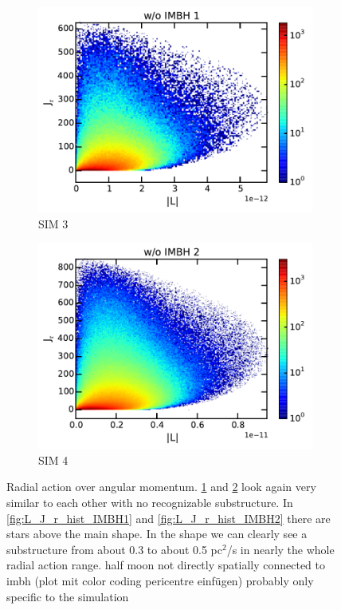 \begin{figure}[htbp]
\begin{subfigure}{0.475\textwidth}
		\includegraphics[width=\textwidth]{Plots/L_J_r_hist_noIMBH1.pdf}
		\caption{SIM 3}
		\label{fig:L_J_r_hist_noIMBH1}
	\end{subfigure}
	\hfill
	\begin{subfigure}{0.475\textwidth}
		\includegraphics[width=\textwidth]{Plots/L_J_r_hist_noIMBH2.pdf}
		\caption{SIM 4}
		\label{fig:L_J_r_hist_noIMBH2}
	\end{subfigure}
	\caption{Radial action over angular momentum. \ref{fig:L_J_r_hist_noIMBH1} and \ref{fig:L_J_r_hist_noIMBH2} look again very similar to each other with no recognizable substructure. In \ref{fig:L_J_r_hist_IMBH1} and \ref{fig:L_J_r_hist_IMBH2} there are stars above the main shape. In the shape we can clearly see a substructure from about 0.3 to about 0.5 pc\(^2\)/s in nearly the whole radial action range. \color{red}half moon not directly spatially connected to imbh (plot mit color coding pericentre einfügen) probably only specific to the simulation\color{black}}
	\label{fig:L_J_r_hist}
\end{figure}
